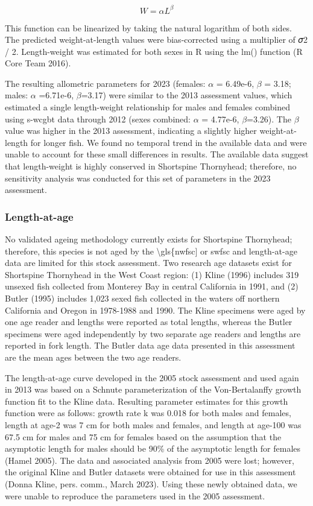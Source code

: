 \documentclass[11pt,
  english,
  letterpaper,
]{article}
\begin{document}
\begin{equation} W = \alpha L^{\beta} \end{equation}

This function can be linearized by taking the natural logarithm of both sides. The predicted weight-at-length values were bias-corrected using a multiplier of 𝜎2 / 2. Length-weight was estimated for both sexes in R using the lm() function (R Core Team 2016).

The resulting allometric parameters for 2023 (females: \(\alpha\) = 6.49e-6, \(\beta\) = 3.18; males: \(\alpha\) =6.71e-6, \(\beta\)=3.17) were similar to the 2013 assessment values, which estimated a single length-weight relationship for males and females combined using \gls{s-wcgbt} data through 2012 (sexes combined: \(\alpha\) = 4.77e-6, \(\beta\)=3.26). The \(\beta\) value was higher in the 2013 assessment, indicating a slightly higher weight-at-length for longer fish. We found no temporal trend in the available data and were unable to account for these small differences in results. The available data suggest that length-weight is highly conserved in Shortspine Thornyhead; therefore, no sensitivity analysis was conducted for this set of parameters in the 2023 assessment.

\hypertarget{length-at-age}{%
\subsubsection{Length-at-age}\label{length-at-age}}

No validated ageing methodology currently exists for Shortspine Thornyhead; therefore, this species is not aged by the \textbackslash gls\{nwfsc{]} or \gls{swfsc} and length-at-age data are limited for this stock assessment. Two research age datasets exist for Shortspine Thornyhead in the West Coast region: (1) Kline (1996) includes 319 unsexed fish collected from Monterey Bay in central California in 1991, and (2) Butler (1995) includes 1,023 sexed fish collected in the waters off northern California and Oregon in 1978-1988 and 1990. The Kline specimens were aged by one age reader and lengths were reported as total lengths, whereas the Butler specimens were aged independently by two separate age readers and lengths are reported in fork length. The Butler data age data presented in this assessment are the mean ages between the two age readers.

The length-at-age curve developed in the 2005 stock assessment and used again in 2013 was based on a Schnute parameterization of the Von-Bertalanffy growth function fit to the Kline data. Resulting parameter estimates for this growth function were as follows: growth rate k was 0.018 for both males and females, length at age-2 was 7 cm for both males and females, and length at age-100 was 67.5 cm for males and 75 cm for females based on the assumption that the asymptotic length for males should be 90\% of the asymptotic length for females (Hamel 2005). The data and associated analysis from 2005 were lost; however, the original Kline and Butler datasets were obtained for use in this assessment (Donna Kline, pers. comm., March 2023). Using these newly obtained data, we were unable to reproduce the parameters used in the 2005 assessment.
\end{document}
